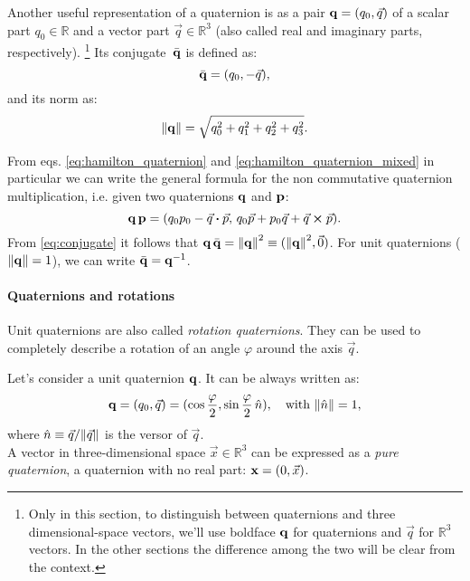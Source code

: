 Another useful representation of a quaternion is as a pair $\mathbf{q} = (q_0, \vec q)$ of a scalar part $q_0\in \mathbb{R}$ and a vector part $\vec q \in \mathbb{R}^3$ (also called real and imaginary parts, respectively).
\footnote{Only in this section, to distinguish between quaternions and three dimensional-space vectors, we'll use boldface $\mathbf{q}$ for quaternions and $\vec q$ for $\mathbb{R}^3$ vectors. In the other sections the difference among the two will be clear from the context.}
Its conjugate~$\bar{\mathbf{q}}$ is defined as:
\begin{equation}
 \bar{\mathbf{q}} = (q_0, -\vec q),
 \label{eq:conjugate}
\end{equation}
and its norm as:
\begin{equation}
 \norm{\mathbf{q}} = \sqrt{q_0^2+q_1^2+q_2^2+q_3^2}.
\end{equation}

From eqs. \eqref{eq:hamilton_quaternion} and \eqref{eq:hamilton_quaternion_mixed} in particular we can write the general formula for the non commutative quaternion multiplication, i.e. given two quaternions $\mathbf{q}$ and $\mathbf{p}$:
\begin{equation}
 \quat{q} \,\quat{p} = (q_0 p_0 - \vec q \vdot \vec p, \, q_0 \vec p + p_0 \vec q + \vec q \cross \vec p).
 \label{eq:quaternion_multiplication}
\end{equation}
From \eqref{eq:conjugate} it follows that $\mathbf{q} \,\bar{\mathbf{q}} = \norm{\mathbf{q}}^2 \equiv (\norm{\mathbf{q}}^2, \vec 0)$. For unit quaternions ($\norm{\mathbf{q}} = 1$), we can write $\bar{\mathbf{q}} = \mathbf{q}^{-1}$.%

\paragraph{Quaternions and rotations} Unit quaternions are also called \emph{rotation quaternions}.
They can be used to completely describe a rotation of an angle $\varphi$ around the axis $\vec q$.

Let's consider a unit quaternion $\mathbf{q}$. It can be always written as:
\begin{equation}
  \label{eq:quaternion_with_angle}
 \mathbf{q} = (q_0, \vec q) = (\cos \frac \varphi 2, \sin \frac \varphi 2\, \hat n), \quad \text{with } \norm{\hat n}=1,
\end{equation}
where $\hat n \equiv \vec q/\norm{\vec q}$ is the versor of $\vec q$.\\
A vector in three-dimensional space $\vec x \in \mathbb R^3$ can be expressed as a \emph{pure quaternion}, a quaternion with no real part: $\boldsymbol{\mathbf{x}} = (0, \vec x)$.

